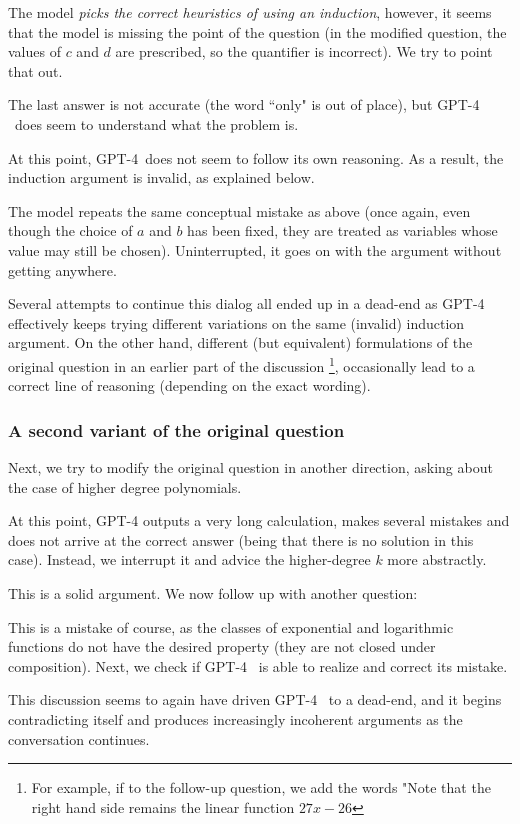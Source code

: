 The model \emph{picks the correct heuristics of using an induction}, however, it seems that the model is missing the point of the question (in the modified question, the values of $c$ and $d$ are prescribed, so the quantifier is incorrect). We try to point that out.

The last answer is not accurate (the word ``only" is out of place), but GPT-4 \ does seem to understand what the problem is. 

At this point, GPT-4~does not seem to follow its own reasoning. As a result, the induction argument is invalid, as explained below.

The model repeats the same conceptual mistake as above (once again, even though the choice of $a$ and $b$ has been fixed, they are treated as variables whose value may still be chosen). Uninterrupted, it goes on with the argument without getting anywhere.

Several attempts to continue this dialog all ended up in a dead-end as {GPT-4} effectively keeps trying different variations on the same (invalid) induction argument. On the other hand, different (but equivalent) formulations of the original question in an earlier part of the discussion \footnote{For example, if to the follow-up question, we add the words "Note that the right hand side remains the linear function $27x - 26$}, occasionally lead to a correct line of reasoning (depending on the exact wording).

\subsubsection{A second variant of the original question} Next, we try to modify the original question in another direction, asking about the case of higher degree polynomials.

At this point, {GPT-4} outputs a very long calculation, makes several mistakes and does not arrive at the correct answer (being that there is no solution in this case). Instead, we interrupt it and advice the higher-degree $k$ more abstractly.

This is a solid argument. We now follow up with another question:

This is a mistake of course, as the classes of exponential and logarithmic functions do not have the desired property (they are not closed under composition). Next, we check if GPT-4 \ is able to realize and correct its mistake.

This discussion seems to again have driven GPT-4 \ to a dead-end, and it begins contradicting itself and produces increasingly incoherent arguments as the conversation continues. 

